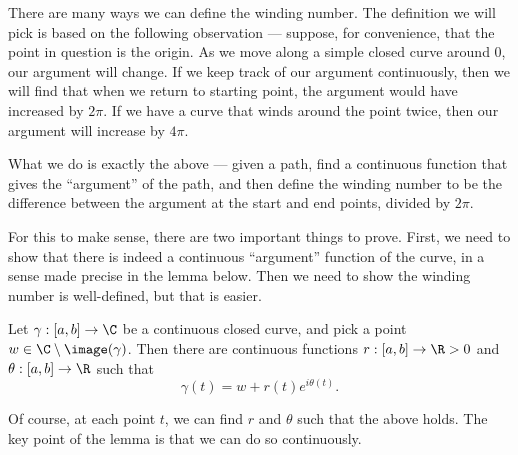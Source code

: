 \documentclass[a4paper]{article}
\begin{document}
There are many ways we can define the winding number. The definition we will pick is based on the following observation --- suppose, for convenience, that the point in question is the origin. As we move along a simple closed curve around $0$, our argument will change. If we keep track of our argument continuously, then we will find that when we return to starting point, the argument would have increased by $2\pi$. If we have a curve that winds around the point twice, then our argument will increase by $4\pi$.

What we do is exactly the above --- given a path, find a continuous function that gives the ``argument'' of the path, and then define the winding number to be the difference between the argument at the start and end points, divided by $2\pi$.

For this to make sense, there are two important things to prove. First, we need to show that there is indeed a continuous ``argument'' function of the curve, in a sense made precise in the lemma below. Then we need to show the winding number is well-defined, but that is easier.
\begin{lemma}
  Let $\gamma: [a, b] \to \C$ be a continuous closed curve, and pick a point $w \in \C \setminus \image (\gamma)$. Then there are continuous functions $r: [a, b] \to \R > 0$ and $\theta: [a, b] \to \R$ such that
  \[
    \gamma(t) = w + r(t) e^{i\theta(t)}.
  \]
\end{lemma}
Of course, at each point $t$, we can find $r$ and $\theta$ such that the above holds. The key point of the lemma is that we can do so continuously.
\end{document}
